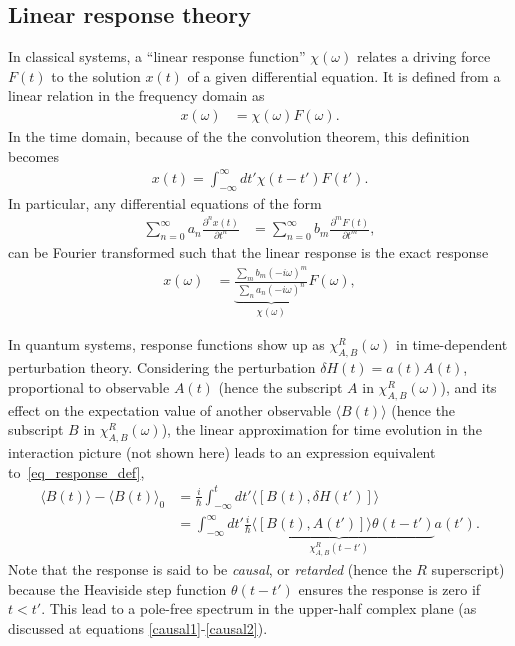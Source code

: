 \documentclass[notitlepage, 11pt, nofootinbib]{revtex4-1}
\begin{document}
\subsection{Linear response theory}
In classical systems, a ``linear response function'' $\chi(\omega)$ relates a driving force $F(t)$ to the solution $x(t)$ of a given differential equation. It is defined from a linear relation in the frequency domain as
\begin{align}
x(\omega)
&= \chi(\omega) F(\omega).
\label{eq_response_freq_def}
\end{align}
In the time domain, because of the the convolution theorem, this definition becomes
\begin{align} 
x(t) = \int_{-\infty}^{\infty}dt' \chi(t-t') F(t').
\label{eq_response_def}
\end{align}
In particular, any differential equations of the form
\begin{align}
\sum_{n=0}^{\infty} a_n \frac{\partial^n x(t)}{\partial t^n}
&= 
\sum_{n=0}^{\infty} b_m \frac{\partial^m F(t)}{\partial t^m},
\end{align}
can be Fourier transformed such that the linear response is the exact response
\begin{align}
x(\omega) &= \underbrace{\frac{\sum_{m} b_m (-i\omega)^m}{\sum_{n} a_n (-i\omega)^n}}_{\chi(\omega)} F(\omega),
\end{align}

In quantum systems, response functions show up as $\chi^{R}_{A,B}(\omega)$ in time-dependent perturbation theory. Considering the perturbation $\delta H(t) = a(t) A(t)$, proportional to observable $A(t)$ (hence the subscript $A$ in $\chi^{R}_{A,B}(\omega)$), and its effect on the expectation value of another observable $\langle B(t) \rangle$ (hence the subscript $B$ in $\chi^{R}_{A,B}(\omega)$), the linear approximation for time evolution in the interaction picture (not shown here) leads to an expression equivalent to~\eqref{eq_response_def},
\begin{align}
    \langle B(t) \rangle - \langle B(t) \rangle_0 
    &=
    \frac{i}{\hbar} 
    \int_{-\infty}^{t} dt'
    \langle [B(t), \delta H(t')] \rangle
    \\&=
    \int_{-\infty}^{\infty}dt'
    \underbrace{ 
    \frac{i}{\hbar} 
    \langle [B(t), A(t')] \rangle 
    \theta(t-t')
    }_{\chi^{R}_{A,B}(t-t')}
    a(t').
\end{align}
Note that the response is said to be \emph{causal}, or \emph{retarded} (hence the $R$ superscript) because the Heaviside step function $\theta(t-t')$ ensures the response is zero if $t<t'$. This lead to a pole-free spectrum in the upper-half complex plane (as discussed at equations \eqref{causal1}-\eqref{causal2}).
\end{document}
